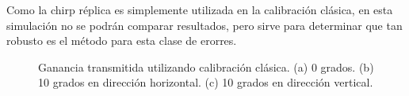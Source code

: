 Como la chirp réplica es simplemente utilizada en la calibración clásica, en esta simulación no se podrán comparar 
resultados, pero sirve para determinar que tan robusto es el método para esta clase de erorres.
\begin{figure}[H]
	\centering
 	
		\caption{Ganancia transmitida utilizando calibración clásica. (a) 0 grados. (b) 10 grados en 
		dirección horizontal. (c) 10 grados en dirección vertical.}
	\label{fig:chirpRepErrorClassical}
\end{figure}
